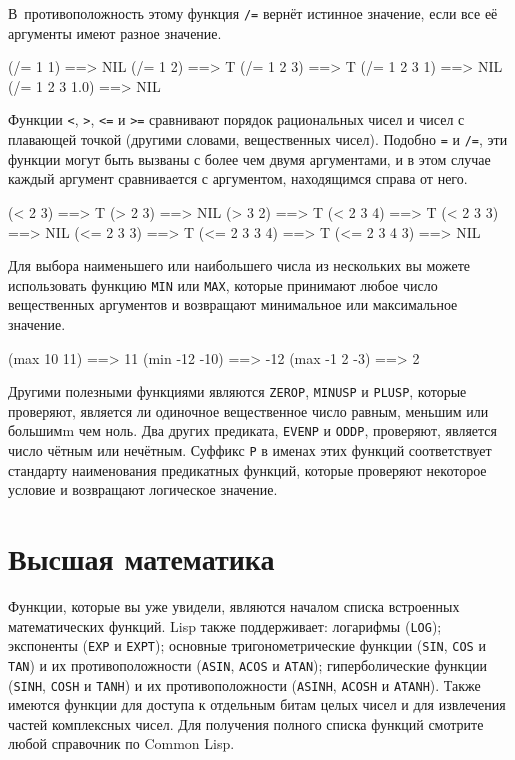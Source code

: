 В~противоположность этому функция \lstinline{/=} вернёт истинное значение, если все её
аргументы имеют разное значение.

\begin{myverb}
(/= 1 1)        ==> NIL
(/= 1 2)        ==> T
(/= 1 2 3)      ==> T
(/= 1 2 3 1)    ==> NIL
(/= 1 2 3 1.0)  ==> NIL
\end{myverb}

Функции \lstinline{<}, \lstinline{>}, \lstinline{<=} и \lstinline{>=} сравнивают порядок
рациональных чисел и чисел с пла\-ваю\-щей точкой (другими словами, вещественных чисел).
Подобно \lstinline{=} и \lstinline{/=}, эти функции могут быть вызваны с более чем двумя
аргументами, и в этом случае каждый аргумент сравнивается с аргументом, находящимся справа
от него.

\begin{myverb}
(< 2 3)       ==> T
(> 2 3)       ==> NIL
(> 3 2)       ==> T
(< 2 3 4)     ==> T
(< 2 3 3)     ==> NIL
(<= 2 3 3)    ==> T
(<= 2 3 3 4)  ==> T
(<= 2 3 4 3)  ==> NIL
\end{myverb}

Для выбора наименьшего или наибольшего числа из нескольких вы можете использовать функцию
\lstinline{MIN} или \lstinline{MAX}, которые принимают любое число вещественных аргументов и
возвращают минимальное или максимальное значение.

\begin{myverb}
(max 10 11)    ==> 11
(min -12 -10)  ==> -12
(max -1 2 -3)  ==> 2
\end{myverb}

Другими полезными функциями являются \lstinline{ZEROP}, \lstinline{MINUSP} и \lstinline{PLUSP}, которые
проверяют, является ли одиночное вещественное число равным, меньшим или большимm чем ноль.
Два других предиката, \lstinline{EVENP} и \lstinline{ODDP}, проверяют, является число чётным или
нечётным.  Суффикс \lstinline{P} в именах этих функций соответствует стандарту наименования
предикатных функций, которые проверяют некоторое условие и возвращают логическое значение.

\section{Высшая математика}

Функции, которые вы уже увидели, являются началом списка встроенных математических
функций. Lisp также поддерживает: логарифмы (\lstinline{LOG}); экспоненты (\lstinline{EXP} и
\lstinline{EXPT}); основные тригонометрические функции (\lstinline{SIN}, \lstinline{COS} и \lstinline{TAN}) и
их противоположности (\lstinline{ASIN}, \lstinline{ACOS} и \lstinline{ATAN}); гиперболические функции
(\lstinline{SINH}, \lstinline{COSH} и \lstinline{TANH}) и их противоположности (\lstinline{ASINH},
\lstinline{ACOSH} и \lstinline{ATANH}).  Также имеются функции для доступа к отдельным битам целых
чисел и для извлечения частей комплексных чисел.  Для получения полного списка функций
смотрите любой справочник по Common Lisp.

